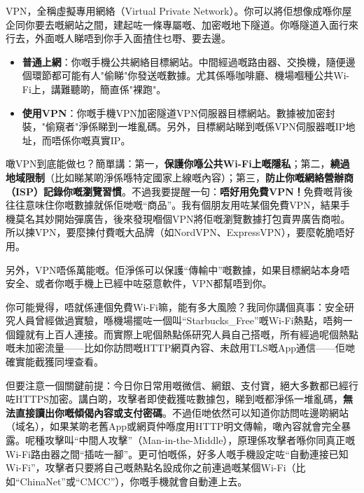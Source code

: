 


VPN，全稱虛擬專用網絡（Virtual Private Network）。你可以將佢想像成喺你屋企同你要去嘅網站之間，建起咗一條專屬嘅、加密嘅地下隧道。你喺隧道入面行來行去，外面嘅人睇唔到你手入面揸住乜嘢、要去邊。

\begin{itemize}
  \item \textbf{普通上網}：你嘅手機公共網絡目標網站。中間經過嘅路由器、交換機，隨便邊個環節都可能有人"偷睇"你發送嘅數據。尤其係喺咖啡廳、機場嗰種公共Wi-Fi上，講難聽啲，簡直係"裸跑"。
  \item \textbf{使用VPN}：你嘅手機VPN加密隧道VPN伺服器目標網站。數據被加密封裝，"偷窺者"淨係睇到一堆亂碼。另外，目標網站睇到嘅係VPN伺服器嘅IP地址，而唔係你嘅真實IP。
\end{itemize}

噉VPN到底能做乜？簡單講：第一，\textbf{保護你喺公共Wi-Fi上嘅隱私}；第二，\textbf{繞過地域限制}（比如睇某啲淨係喺特定國家上線嘅內容）；第三，\textbf{防止你嘅網絡營辦商（ISP）記錄你嘅瀏覽習慣}。不過我要提醒一句：\textbf{唔好用免費VPN！}免費嘅背後往往意味住你嘅數據就係佢哋嘅“商品”。我有個朋友用咗某個免費VPN，結果手機莫名其妙開始彈廣告，後來發現嗰個VPN將佢嘅瀏覽數據打包賣畀廣告商啦。所以揀VPN，要麼揀付費嘅大品牌（如NordVPN、ExpressVPN），要麼乾脆唔好用。

另外，VPN唔係萬能嘅。佢淨係可以保護“傳輸中”嘅數據，如果目標網站本身唔安全、或者你嘅手機上已經中咗惡意軟件，VPN都幫唔到你。


你可能覺得，唔就係連個免費Wi-Fi嘛，能有多大風險？我同你講個真事：安全研究人員曾經做過實驗，喺機場擺咗一個叫“Starbucks\_Free”嘅Wi-Fi熱點，唔夠一個鐘就有上百人連接。而實際上呢個熱點係研究人員自己搭嘅，所有經過呢個熱點嘅未加密流量——比如你訪問嘅HTTP網頁內容、未啟用TLS嘅App通信——佢哋確實能截獲同埋查看。

但要注意一個關鍵前提：今日你日常用嘅微信、網銀、支付寶，絕大多數都已經行咗HTTPS加密。講白啲，攻擊者即使截獲咗數據包，睇到嘅都淨係一堆亂碼，\textbf{無法直接讀出你嘅傾偈內容或支付密碼}。不過佢哋依然可以知道你訪問咗邊啲網站（域名），如果某啲老舊App或網頁仲喺度用HTTP明文傳輸，噉內容就會完全暴露。呢種攻擊叫“中間人攻擊”（Man-in-the-Middle），原理係攻擊者喺你同真正嘅Wi-Fi路由器之間“插咗一腳”。更可怕嘅係，好多人嘅手機設定咗“自動連接已知Wi-Fi”，攻擊者只要將自己嘅熱點名設成你之前連過嘅某個Wi-Fi（比如“ChinaNet”或“CMCC”），你嘅手機就會自動連上去。

